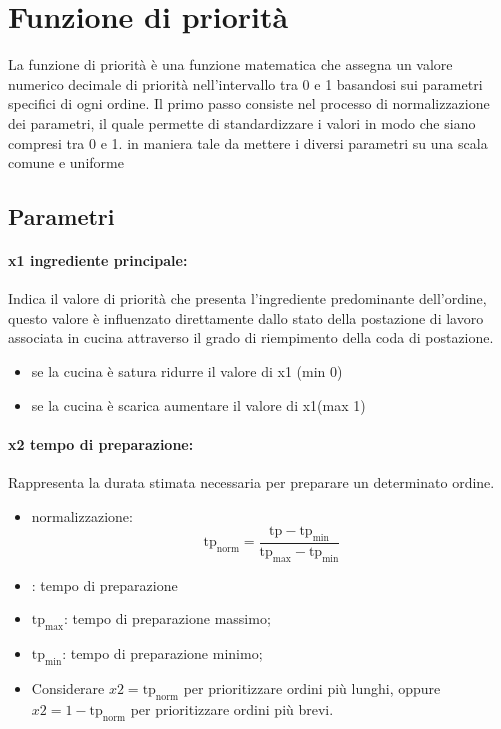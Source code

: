 \section{Funzione di priorità}
La funzione di priorità è una funzione matematica che assegna un valore numerico decimale di priorità nell’intervallo tra 0 e 1 basandosi sui parametri specifici di ogni ordine.
Il primo passo consiste nel processo di normalizzazione dei parametri, il quale permette di standardizzare i valori in modo che siano compresi tra 0 e 1. in maniera tale da mettere i diversi parametri su una scala comune e uniforme

\subsection{Parametri}

\paragraph{x1 ingrediente principale:}
Indica il valore di priorità che presenta l'ingrediente predominante dell’ordine, questo valore è influenzato direttamente dallo stato della postazione di lavoro associata in cucina attraverso il grado di riempimento della coda di postazione.
\begin{itemize}
	\item se la cucina è satura ridurre il valore di x1 (min 0)
	\item se la cucina è scarica aumentare il valore di x1(max 1)
\end{itemize}

\paragraph{x2 tempo di preparazione:}
Rappresenta la durata stimata necessaria per preparare un determinato ordine.
\begin{itemize}
	\item normalizzazione: 
	\begin{equation*}
		\text{tp}_{\text{norm}} = \frac{\text{tp} - \text{tp}_{\text{min}}}{\text{tp}_{\text{max}} - \text{tp}_{\text{min}}}	
	\end{equation*}
	
	\item {}: tempo di preparazione
	\item $\text{tp}_{\text{max}}$: tempo di preparazione massimo;
	\item $\text{tp}_{\text{min}}$: tempo di preparazione minimo;
	\item Considerare $x2 = \text{tp}_{\text{norm}}$ per prioritizzare ordini più lunghi, oppure $x2 = 1-\text{tp}_{\text{norm}}$ per prioritizzare ordini più brevi.
\end{itemize}

